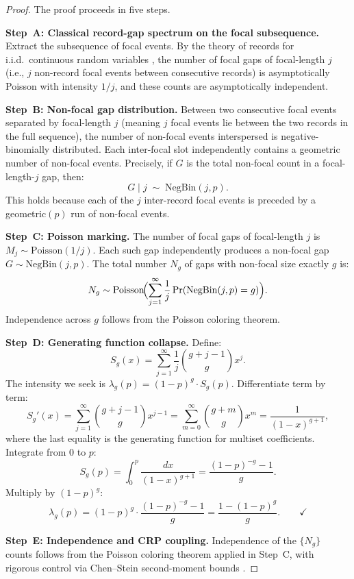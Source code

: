 \documentclass[11pt]{article}
\theoremstyle{plain}
\theoremstyle{definition}
\theoremstyle{remark}
\begin{document}
\begin{proof}
The proof proceeds in five steps.

\textbf{Step~A: Classical record-gap spectrum on the focal
subsequence.}  Extract the subsequence of focal events.  By the theory
of records for i.i.d.\ continuous random variables
\cite{nevzorov2001records,arnold1998records,renyi1962theorie}, the
number of focal gaps of focal-length $j$ (i.e., $j$ non-record focal
events between consecutive records) is asymptotically Poisson with
intensity $1/j$, and these counts are asymptotically independent.

\textbf{Step~B: Non-focal gap distribution.}  Between two consecutive
focal events separated by focal-length $j$ (meaning $j$ focal events
lie between the two records in the full sequence), the number of
non-focal events interspersed is negative-binomially distributed.  Each
inter-focal slot independently contains a geometric number of non-focal
events.  Precisely, if $G$ is the total non-focal count in a
focal-length-$j$ gap, then:
\[
  G \mid j \;\sim\; \mathrm{NegBin}(j, p).
\]
This holds because each of the $j$ inter-record focal events is
preceded by a geometric$(p)$ run of non-focal events.

\textbf{Step~C: Poisson marking.}  The number of focal gaps of
focal-length $j$ is $M_j \sim \mathrm{Poisson}(1/j)$.  Each such gap
independently produces a non-focal gap $G \sim \mathrm{NegBin}(j,p)$.
The total number $N_g$ of gaps with non-focal size exactly $g$ is:
\[
  N_g \sim \mathrm{Poisson}\!\Bigl(\sum_{j=1}^{\infty}
  \frac{1}{j} \Pr(\mathrm{NegBin}(j,p) = g)\Bigr).
\]
Independence across $g$ follows from the Poisson coloring theorem.

\textbf{Step~D: Generating function collapse.}  Define:
\[
  S_g(x) = \sum_{j=1}^{\infty} \frac{1}{j} \binom{g+j-1}{g} x^j.
\]
The intensity we seek is $\lambda_g(p) = (1-p)^g \cdot S_g(p)$.
Differentiate term by term:
\[
  S_g'(x) = \sum_{j=1}^{\infty} \binom{g+j-1}{g} x^{j-1}
  = \sum_{m=0}^{\infty} \binom{g+m}{g} x^m
  = \frac{1}{(1-x)^{g+1}},
\]
where the last equality is the generating function for multiset
coefficients.  Integrate from $0$ to $p$:
\[
  S_g(p) = \int_0^p \frac{dx}{(1-x)^{g+1}}
  = \frac{(1-p)^{-g} - 1}{g}.
\]
Multiply by $(1-p)^g$:
\begin{equation}\label{eq:lambda-derivation}
  \lambda_g(p) = (1-p)^g \cdot \frac{(1-p)^{-g} - 1}{g}
  = \frac{1 - (1-p)^g}{g}. \qquad\checkmark
\end{equation}

\textbf{Step~E: Independence and CRP coupling.}  Independence of the
$\{N_g\}$ counts follows from the Poisson coloring theorem applied in
Step~C, with rigorous control via Chen--Stein second-moment bounds
\cite{arratia2003logarithmic}.


\end{proof}
\end{document}
